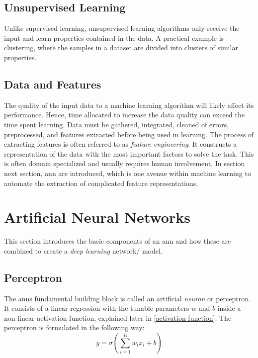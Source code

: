         \subsection{Unsupervised Learning}
            Unlike supervised learning, unsupervised learning algorithms only receive the input and learn properties contained in the data\cite{Goodfellow-et-al-2016}. A practical example is clustering, where the samples in a dataset are divided into clusters of similar properties. 
    
    \subsection{Data and Features}
    The quality of the input data to a machine learning algorithm will likely affect its performance\cite{najafabadi2015deep}. Hence, time allocated to increase the data quality can exceed the time spent learning.  Data must be gathered, integrated, cleaned of errors, preprocessed, and features extracted before being used in learning. The process of extracting features is often referred to as \textit{feature engineering}. It constructs a representation of the data with the most important factors to solve the task. This is often domain specialized and usually requires human involvement. In section next section, \gls{ann} are introduced, which is one avenue within machine learning to automate the extraction of complicated feature representations.


\section{Artificial Neural Networks} \label{neural networks}
    This section introduces the basic components of an \gls{ann} and how these are combined to create a \textit{deep learning} network/ model. 

    \subsection{Perceptron} \label{perceptron}
        The \gls{ann}s fundamental building block is called an artificial \textit{neuron} or perceptron. It consists of a linear regression with the tunable parameters $w$ and $b$ inside a non-linear activation function, explained later in \ref{activation function}. The perceptron is formulated in the following way\cite{razavi2021deep_exp_per}:
            \begin{equation} \label{eq_perceptron}
                y = \sigma(\sum_{i=1}^{D}w_ix_i + b)
            \end{equation}
            
